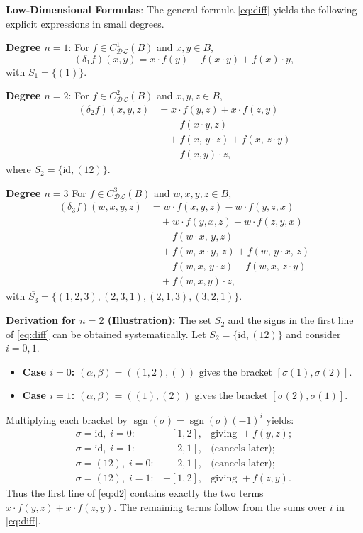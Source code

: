 \documentclass[a4paper, 12pt,oneside,reqno]{amsart}
\newcommand{\DL}{\mathcal{DL}}
\newcommand{\cochain}[2]{C^{#1}_{\DL}(#2)}
\begin{document}
\textbf{Low-Dimensional Formulas}: The general formula \eqref{eq:diff} yields the following explicit expressions in small degrees.

\textbf{Degree $n=1$}:
For $f\in \cochain{1}{B}$ and $x,y\in B$,
\[
(\delta_1 f)(x,y)=x\cdot f(y)-f(x\cdot y)+f(x)\cdot y,
\label{eq:d1}
\]
with $\overline{S_1}=\{(1)\}$.

\textbf{Degree $n=2$}:
For $f\in \cochain{2}{B}$ and $x,y,z\in B$,
\begin{align}
(\delta_2 f)(x,y,z)
&= x\cdot f(y,z)+x\cdot f(z,y) \nonumber\\
&\quad -f(x\cdot y,z) \nonumber\\
&\quad +f(x,\,y\cdot z)+f(x,\,z\cdot y) \nonumber\\
&\quad -f(x,y)\cdot z,
\label{eq:d2}
\end{align}
where $\overline{S_2}=\{\mathrm{id},(12)\}$.

\textbf{Degree $n=3$}
For $f\in \cochain{3}{B}$ and $w,x,y,z\in B$,
\begin{align}
(\delta_3 f)(w,x,y,z)
&= w\cdot f(x,y,z)-w\cdot f(y,z,x) \nonumber\\
&\quad +w\cdot f(y,x,z)-w\cdot f(z,y,x) \nonumber\\
&\quad -f(w\cdot x,\,y,z) \nonumber\\
&\quad +f(w,\,x\cdot y,\,z)+f(w,\,y\cdot x,\,z) \nonumber\\
&\quad -f(w,x,\,y\cdot z)-f(w,x,\,z\cdot y) \nonumber\\
&\quad +f(w,x,y)\cdot z,
\label{eq:d3}
\end{align}
with $\overline{S_3}= \{(1,2,3),(2,3,1),(2,1,3),(3,2,1)\}$.

\textbf{Derivation for $n=2$ (Illustration):}
The set $\overline{S_2}$ and the signs in the first line of \eqref{eq:diff} can be obtained systematically.  
Let $S_2=\{\mathrm{id},(12)\}$ and consider $i=0,1$.

\begin{itemize}[leftmargin=*]
\item \textbf{Case $i=0$:} $(\alpha,\beta)=((1,2),())$ gives the bracket $[\sigma(1),\sigma(2)]$.
\item \textbf{Case $i=1$:} $(\alpha,\beta)=((1),(2))$ gives the bracket $[\sigma(2),\sigma(1)]$.
\end{itemize}

Multiplying each bracket by $\overline{\operatorname{sgn}}(\sigma)=\operatorname{sgn}(\sigma)(-1)^i$ yields:
\[
\begin{array}{ccl}
\sigma=\mathrm{id},\; i=0: & +[1,2], &\text{giving } +f(y,z);\\[2pt]
\sigma=\mathrm{id},\; i=1: & -[2,1], &\text{(cancels later)};\\[2pt]
\sigma=(12),\; i=0: & -[2,1], &\text{(cancels later)};\\[2pt]
\sigma=(12),\; i=1: & +[1,2], &\text{giving } +f(z,y).
\end{array}
\]
Thus the first line of \eqref{eq:d2} contains exactly the two terms $x\cdot f(y,z)+x\cdot f(z,y)$. The remaining terms follow from the sums over $i$ in \eqref{eq:diff}.
\end{document}
